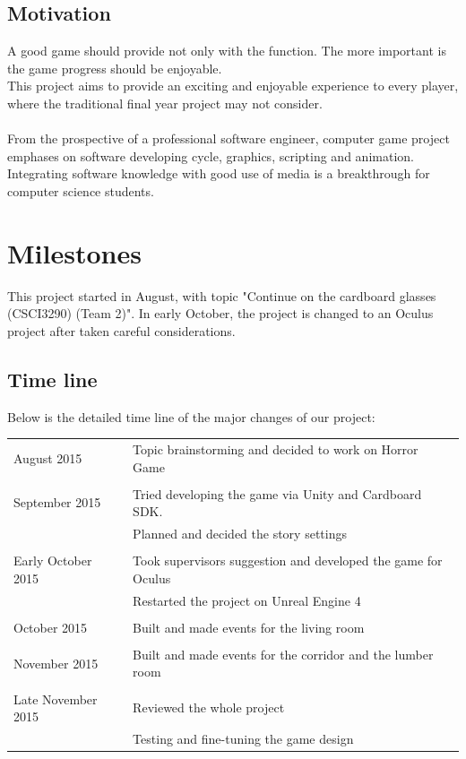\documentclass{article}
\begin{document}
\bigskip

\subsection{Motivation}
A good game should provide not only with the function. The more important is the game progress should be enjoyable.\\This project aims to provide an exciting and enjoyable experience to every player, where the traditional final year project may not consider.\\ \\
From the prospective of a professional software engineer, computer game project emphases on software developing cycle, graphics, scripting and animation. Integrating software knowledge with good use of media is a breakthrough for computer science students.

\clearpage

\section{Milestones}
This project started in August, with topic "Continue on the cardboard glasses (CSCI3290) (Team 2)". In early October, the project is changed to an Oculus project after taken careful considerations.
\subsection{Time line}
Below is the detailed time line of the major changes of our project:
\begin{center}
  \begin{tabular}{ l | p{12cm} }
    August 2015 & Topic brainstorming and decided to work on Horror Game \\
     & \\
    September 2015 & Tried developing the game via Unity and Cardboard SDK.  \\
     & Planned and decided the story settings \\
     & \\
    Early October 2015 & Took supervisor\textsc{\char13}s suggestion and developed the game for Oculus \\
     & Restarted the project on Unreal Engine 4 \\
      & \\
    October 2015 & Built and made events for the living room \\
     & \\
    November 2015 & Built and made events for the corridor and the lumber room \\ 
     & \\
    Late November 2015 & Reviewed the whole project \\
     & Testing and fine-tuning the game design
  \end{tabular}
\end{center}
\end{document}
